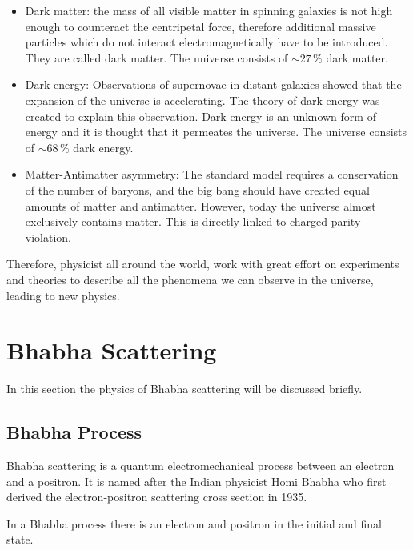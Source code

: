 \documentclass[a4paper,11pt,twosided,final,german,openbib,pdftex,listof=totoc,bibliography=totoc]{scrbook}
\begin{document}
\begin{itemize}
	
\item Dark matter: the mass of all visible matter in spinning galaxies is not high enough to counteract the centripetal force, therefore additional massive particles which do not interact electromagnetically have to be introduced. They are called dark matter. The universe consists of $\sim 27\,\%$ dark matter.\cite{DarkMAtter}


\item Dark energy: Observations of supernovae in distant galaxies showed that the expansion of the universe is accelerating. The theory of dark energy was created to explain this observation. Dark energy is an unknown form of energy and it is thought that it permeates the universe. The universe consists of $\sim 68\,\%$ dark energy.\cite{Janka}


\item  Matter-Antimatter asymmetry: The standard model requires a conservation of the number of baryons, and the big bang should have created equal amounts of matter and antimatter. However, today the universe almost exclusively contains matter. This is directly linked to charged-parity violation.\cite{HAMBYE2012193}


\end{itemize}

Therefore, physicist all around the world, work with great effort on experiments and theories to describe all the phenomena we can observe in the universe, leading to new physics.

\section{Bhabha Scattering}
\label{sec:Bhabha}

In this section the physics of Bhabha scattering will be discussed briefly.
 
\subsection{Bhabha Process}
 \label{sec:BhabhaProcess}
 Bhabha scattering is a quantum electromechanical process between an electron and a positron. It is named after the Indian  physicist Homi Bhabha who first derived the electron-positron scattering cross section in 1935.\cite{Bhabha}
 
In a Bhabha process there is an electron and positron in the initial and final state. 
\end{document}
